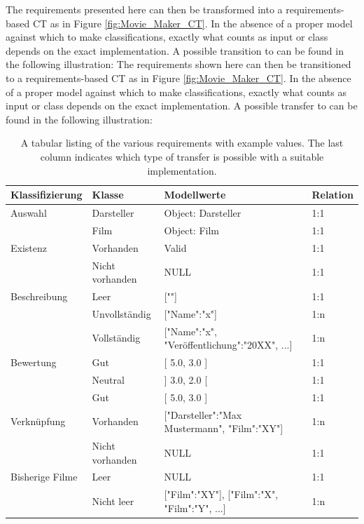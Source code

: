 The requirements presented here can then be transformed into a requirements-based CT as in Figure \ref{fig:Movie_Maker_CT}. In the absence of a proper model against which to make classifications, exactly what counts as input or class depends on the exact implementation. A possible transition to \cite{Conrad} can be found in the following illustration: The requirements shown here can then be transitioned to a requirements-based CT as in Figure \ref{fig:Movie_Maker_CT}. In the absence of a proper model against which to make classifications, exactly what counts as input or class depends on the exact implementation. A possible transfer to \cite{Conrad} can be found in the following illustration:

\begin{table}[t] 
\centering
\begin{small}

\caption{A tabular listing of the various requirements with example values. The last column indicates which type of transfer is possible with a suitable implementation.}
\label{tab:ueberfuehrung}

\setlength{\tabcolsep}{1em}
\begin{tabular}{ | p{2cm} p{3cm} p{5cm} p{1cm} }
	\hline
	\textbf{Klassifizierung} & \textbf{Klasse} & \textbf{Modellwerte} & \textbf{Relation} \\
	\hline
	\hline	
	Auswahl & Darsteller & Object: Darsteller & 1:1 \\
	\hline
	   & Film & Object: Film & 1:1 \\
	\hline
	Existenz & Vorhanden & Valid & 1:1 \\
	\hline
	   & Nicht vorhanden & NULL & 1:1 \\
	\hline
	Beschreibung & Leer & [""] & 1:1 \\
	\hline
	   & Unvollständig & ["Name":"x"] & 1:n \\
	\hline
	   & Vollständig & ["Name":"x", "Veröffentlichung":"20XX", ...] & 1:n \\
	\hline
	Bewertung & Gut & [ 5.0, 3.0 ] & 1:1 \\
	\hline
	   & Neutral & ] 3.0, 2.0 [ & 1:1 \\
	\hline 
	   & Gut & [ 5.0, 3.0 ] & 1:1 \\
	\hline 
	Verknüpfung & Vorhanden & ["Darsteller":"Max Mustermann", "Film":"XY"] & 1:n \\
	\hline 
	   & Nicht vorhanden & NULL & 1:1 \\
	\hline 
	Bisherige Filme & Leer & NULL & 1:1 \\
	\hline 
	   & Nicht leer & ["Film":"XY"], ["Film":"X", "Film":"Y", ...] & 1:n \\
	\hline 
\end{tabular}
\end{small}
\end{table}

